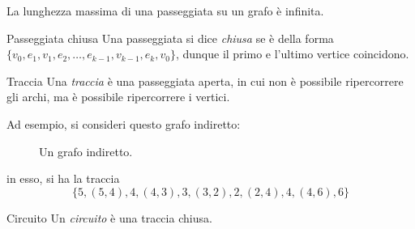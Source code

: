 \documentclass[a4paper, 12pt]{report}
\begin{document}
    \begin{framedobs}{}
        La lunghezza massima di una passeggiata su un grafo è infinita.
    \end{framedobs}

    \begin{frameddefn}{Passeggiata chiusa}
        Una passeggiata si dice \textit{chiusa} se è della forma $\{v_0, e_1, v_1, e_2, \ldots , e_{k - 1}, v_{k - 1}, e_k, v_0\}$, dunque il primo e l'ultimo vertice coincidono. 
    \end{frameddefn}

    \begin{frameddefn}{Traccia}
        Una \textit{traccia} è una passeggiata aperta, in cui non è possibile ripercorrere gli archi, ma è possibile ripercorrere i vertici.
    \end{frameddefn}

    \begin{example}
        Ad esempio, si consideri questo grafo indiretto:

        \begin{figure}[H]
            \centering
            \caption{Un grafo indiretto.}
        \end{figure}

        in esso, si ha la traccia $$\{5, (5,4), 4, (4,3), 3, (3, 2), 2, (2,4), 4, (4, 6), 6\}$$
    \end{example}

    \begin{frameddefn}{Circuito}
        Un \textit{circuito} è una traccia chiusa.
    \end{frameddefn}
\end{document}

